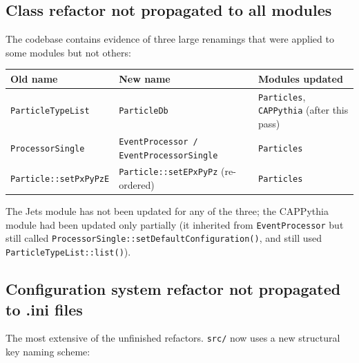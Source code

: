 \documentclass[11pt,a4paper]{article}
\begin{document}
\subsection{Class refactor not propagated to all modules}

The codebase contains evidence of three large renamings that were applied
to some modules but not others:

\begin{center}\small
\begin{tabular}{lll}
\toprule
\textbf{Old name} & \textbf{New name} & \textbf{Modules updated} \\
\midrule
\texttt{ParticleTypeList} & \texttt{ParticleDb} & \texttt{Particles}, \texttt{CAPPythia} (after this pass) \\
\texttt{ProcessorSingle} & \texttt{EventProcessor / EventProcessorSingle} & \texttt{Particles} \\
\texttt{Particle::setPxPyPzE} & \texttt{Particle::setEPxPyPz} (re-ordered) & \texttt{Particles} \\
\bottomrule
\end{tabular}
\end{center}

\noindent
The Jets module has not been updated for any of the three; the CAPPythia
module had been updated only partially (it inherited from
\texttt{EventProcessor} but still called \texttt{ProcessorSingle::setDefaultConfiguration()},
and still used \texttt{ParticleTypeList::list()}).

\subsection{Configuration system refactor not propagated to .ini files}

The most extensive of the unfinished refactors. \texttt{src/} now uses a
new structural key naming scheme:
\end{document}
